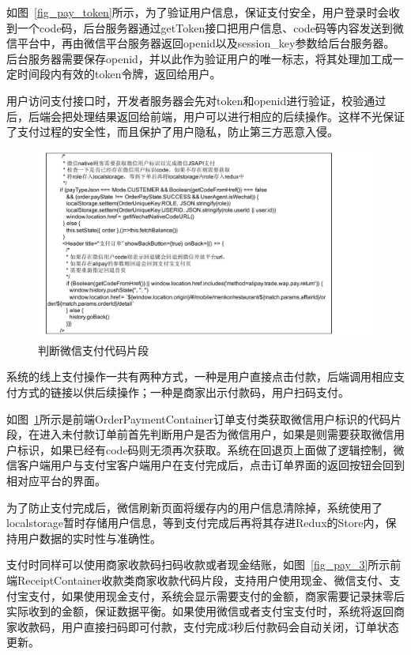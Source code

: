 如图~\ref{fig_pay_token}所示，为了验证用户信息，保证支付安全，用户登录时会收到一个code码，后台服务器通过getToken接口把用户信息、code码等内容发送到微信平台中，再由微信平台服务器返回openid以及session\_key参数给后台服务器。
后台服务器需要保存openid，并以此作为验证用户的唯一标志，将其处理加工成一定时间段内有效的token令牌，返回给用户。

用户访问支付接口时，开发者服务器会先对token和openid进行验证，校验通过后，后端会把处理结果返回给前端，用户可以进行相应的后续操作。这样不光保证了支付过程的安全性，而且保护了用户隐私，防止第三方恶意入侵。

\begin{figure}[htbp!]
    \centering
    \includegraphics[width=\linewidth]{FIGs/chapter4/2.pdf}
    \caption{判断微信支付代码片段}\label{fig_pay_2}
\end{figure}

系统的线上支付操作一共有两种方式，一种是用户直接点击付款，后端调用相应支付方式的链接以供后续操作；一种是商家出示付款码，用户扫码支付。

如图~\ref{fig_pay_2}所示是前端OrderPaymentContainer订单支付类获取微信用户标识的代码片段，在进入未付款订单前首先判断用户是否为微信用户，如果是则需要获取微信用户标识，如果已经有code码则无须再次获取。系统在回退页上面做了逻辑控制，微信客户端用户与支付宝客户端用户在支付完成后，点击订单界面的返回按钮会回到相对应平台的界面。

为了防止支付完成后，微信刷新页面将缓存内的用户信息清除掉，系统使用了localstorage暂时存储用户信息，等到支付完成后再将其存进Redux的Store内，保持用户数据的实时性与准确性。

支付时同样可以使用商家收款码扫码收款或者现金结账，如图~\ref{fig_pay_3}所示前端ReceiptContainer收款类商家收款代码片段，支持用户使用现金、微信支付、支付宝支付，如果使用现金支付，系统会显示需要支付的金额，商家需要记录抹零后实际收到的金额，保证数据平衡。如果使用微信或者支付宝支付时，系统将返回商家收款码，用户直接扫码即可付款，支付完成3秒后付款码会自动关闭，订单状态更新。

